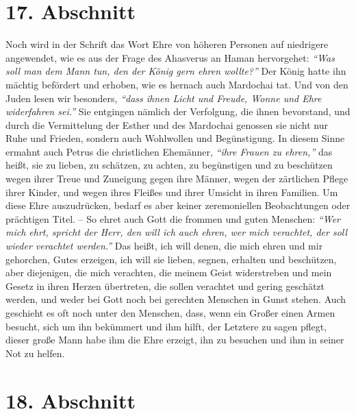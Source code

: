 \section{17. Abschnitt} \label{kap9_ab17}

Noch wird in der Schrift das Wort Ehre von höheren Personen auf niedrigere
angewendet, wie es aus der Frage des Ahasverus
an
Haman hervorgehet:
\textit{"`Was soll man
dem Mann tun, den der König gern ehren wollte?"'}
Der König hatte ihn mächtig befördert und erhoben, wie es hernach auch Mardochai
tat. Und von den Juden lesen wir besonders,
\textit{"`dass ihnen Licht und Freude,
Wonne und Ehre widerfahren sei."'}
Sie entgingen nämlich der
Verfolgung, die ihnen bevorstand, und durch die Vermittelung der
Esther und des
Mardochai genossen sie nicht nur Ruhe und Frieden,
sondern auch Wohlwollen und
Begünstigung. In diesem Sinne ermahnt auch Petrus die christlichen Ehemänner,
\textit{"`ihre Frauen zu ehren,"'} das heißt, sie
zu lieben,
zu schätzen, zu achten, zu
begünstigen und zu beschützen wegen ihrer Treue und Zuneigung gegen ihre Männer,
wegen der zärtlichen Pflege ihrer Kinder, und wegen ihres Fleißes und ihrer
Umsicht in ihren Familien. Um diese Ehre auszudrücken, bedarf es aber keiner
zeremoniellen Beobachtungen oder prächtigen Titel. -- So ehret auch Gott die
frommen und guten Menschen:
\textit{"`Wer mich ehrt, spricht der Herr, den will ich
auch ehren, wer mich verachtet, der soll wieder verachtet werden."'}
Das heißt, ich will denen, die mich ehren und mir gehorchen, Gutes
erzeigen, ich will sie lieben, segnen, erhalten und beschützen, aber diejenigen,
die mich verachten, die meinem Geist widerstreben und mein Gesetz in ihren
Herzen übertreten, die sollen verachtet und
gering geschätzt werden, und weder
bei Gott noch bei gerechten Menschen in Gunst stehen. Auch geschieht es oft
noch unter den Menschen, dass, wenn ein Großer einen Armen besucht, sich um ihn
bekümmert und ihm hilft, der Letztere zu sagen pflegt, dieser große Mann habe
ihm die Ehre erzeigt, ihn zu besuchen und ihm in seiner Not zu helfen.

\section{18. Abschnitt} \label{kap9_ab18}

